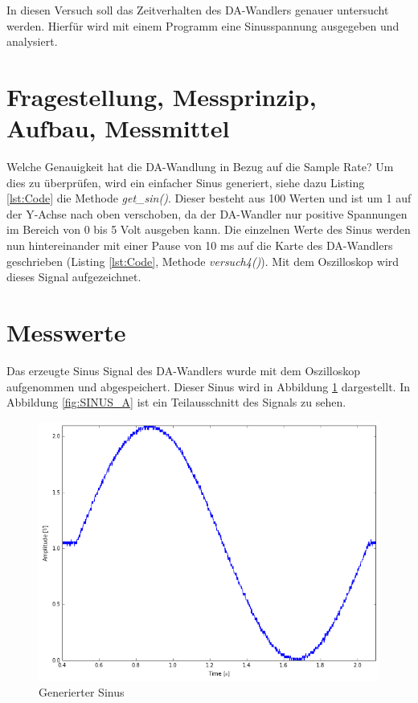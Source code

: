 \documentclass[12pt,oneside,a4paper]{report}
\begin{document}
In diesen Versuch soll das Zeitverhalten des DA-Wandlers genauer untersucht werden.
Hierfür wird mit einem Programm eine Sinusspannung ausgegeben und analysiert.

\section{Fragestellung, Messprinzip, Aufbau, Messmittel}
\label{chap:VERSUCH_3_FRAGESTELLUNG}

Welche Genauigkeit hat die DA-Wandlung in Bezug auf die Sample Rate?
Um dies zu überprüfen, wird ein einfacher Sinus generiert, siehe dazu Listing \ref{lst:Code} die Methode \textit{get\_sin()}. Dieser besteht aus 100 Werten und ist um 1 auf der Y-Achse nach oben verschoben, da der DA-Wandler nur positive Spannungen im Bereich von 0 bis 5 Volt ausgeben kann. Die einzelnen Werte des Sinus werden nun hintereinander mit einer Pause von 10 ms auf die Karte des DA-Wandlers geschrieben (Listing \ref{lst:Code},  Methode \textit{versuch4()}). Mit dem Oszilloskop wird dieses Signal aufgezeichnet.

\section{Messwerte}
\label{chap:VERSUCH_3_MESSWERTE}

Das erzeugte Sinus Signal des DA-Wandlers wurde mit dem Oszilloskop aufgenommen und abgespeichert. Dieser Sinus wird in Abbildung \ref{fig:SINUS} dargestellt.
In Abbildung \ref{fig:SINUS_A} ist ein Teilausschnitt des Signals zu sehen.

\begin{figure}[H]
\centering\small
\includegraphics[scale=0.5]{src/Sinus.png}
\caption{Generierter Sinus}
\label{fig:SINUS}
\end{figure}
\end{document}
